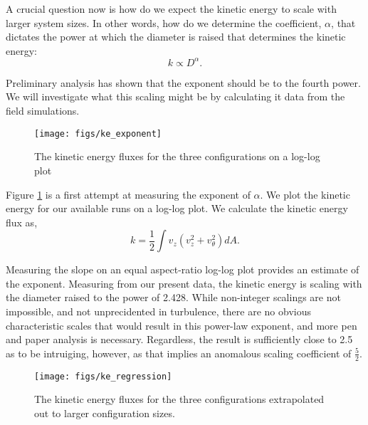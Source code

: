 \documentclass[english]{article}
\begin{document}
A crucial question now is how do we expect the kinetic energy to scale with larger system sizes. In other words, 
how do we determine the coefficient, $\alpha$, that dictates the power at which the diameter is raised that determines 
the kinetic energy: 
\begin{equation}
k \propto D^\alpha. 
\end{equation}

Preliminary analysis has shown that the exponent should be to the fourth power. We will investigate what this 
scaling might be by calculating it data from the field simulations. 

\begin{figure}[!htb]
  \begin{center}
    \texttt{[image: figs/ke\_exponent]}
    \caption{The kinetic energy fluxes for the three configurations on a
   log-log plot}
    \label{fig:ke_exponent}
  \end{center}
\end{figure}

Figure \ref{fig:ke_exponent} is a first attempt at measuring the
exponent of $\alpha$. We plot the kinetic energy for our available
runs on a log-log plot. We calculate the kinetic energy flux as, 
\begin{equation}
k = \frac{1}{2} \int v_z (v_z^2 + v_{\theta}^2) dA. 
\label{ke_flux}
\end{equation}

Measuring the slope on an equal aspect-ratio log-log plot provides an estimate of the exponent. 
Measuring from our present data, the kinetic energy is scaling with the diameter raised to the power of 2.428. 
While non-integer scalings are not impossible, and not unprecidented in turbulence, there are no obvious characteristic scales that would 
result in this power-law exponent, and more pen and paper analysis is necessary. Regardless, the result is sufficiently close to 2.5 as to be
intruiging, however, as that implies an anomalous scaling coefficient of $\frac{5}{2}$. 


\begin{figure}[!htb]
  \begin{center}
    \texttt{[image: figs/ke\_regression]}
    \caption{The kinetic energy fluxes for the three configurations extrapolated out to larger configuration sizes.}
    \label{fig:ke_regression}
  \end{center}
\end{figure}
\end{document}
